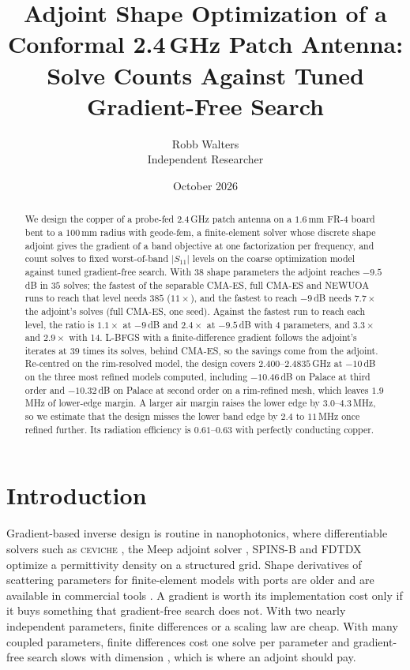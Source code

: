 \documentclass{anvil-paper}
\title{Adjoint Shape Optimization of a Conformal 2.4\,GHz Patch Antenna:
Solve Counts Against Tuned Gradient-Free Search}
\author{Robb Walters\\
  {\normalsize Independent Researcher}}
\date{October 2026}
\begin{document}
\maketitle

\begin{abstract}
We design the copper of a probe-fed 2.4\,GHz patch antenna on a $1.6$\,mm
FR-4 board bent to a $100$\,mm radius with geode-fem, a finite-element
solver whose discrete shape adjoint gives the gradient of a band objective
at one factorization per frequency, and count solves to fixed worst-of-band
$|S_{11}|$ levels on the coarse optimization model against tuned
gradient-free search. With 38 shape parameters the adjoint reaches
$-9.5$\,dB in $35$ solves; the fastest of the separable CMA-ES, full CMA-ES
and NEWUOA runs to reach that level needs $385$ ($11\times$), and the
fastest to reach $-9$\,dB needs $7.7\times$ the adjoint's solves (full
CMA-ES, one seed).
Against the fastest run to reach each level, the ratio is $1.1\times$ at
$-9$\,dB and $2.4\times$ at $-9.5$\,dB with 4 parameters, and $3.3\times$ and
$2.9\times$ with 14. L-BFGS with a finite-difference gradient follows the
adjoint's iterates at $39$ times its solves, behind CMA-ES, so the savings
come from the adjoint. Re-centred on the rim-resolved model, the design covers $2.400$--$2.4835$\,GHz at $-10$\,dB on the
three most refined models computed, including $-10.46$\,dB on Palace at
third order and $-10.32$\,dB on Palace at second order on a rim-refined
mesh, which leaves $1.9$\,MHz of lower-edge margin. A larger air margin
raises the lower edge by $3.0$--$4.3$\,MHz, so we estimate that the design
misses the lower band edge by $2.4$ to $11$\,MHz once refined further. Its
radiation efficiency is $0.61$--$0.63$ with perfectly conducting copper.
\end{abstract}

\section{Introduction}
\label{sec:intro}

Gradient-based inverse design is routine in nanophotonics, where
differentiable solvers such as \textsc{ceviche} \citep{hughes2019forward},
the Meep adjoint solver \citep{hammond2022meepadjoint}, SPINS-B
\citep{su_spinsb} and FDTDX \citep{mahlau2026fdtdx} optimize a permittivity
density on a structured grid. Shape derivatives of scattering parameters for
finite-element models with ports are older
\citep{webb2000design,georgieva2002feasible,nikolova2004adjoint} and are
available in commercial tools
\citep{ansys_hfss_derivatives,comsol_sensitivity_method}. A gradient is worth
its implementation cost only if it buys something that gradient-free search
does not. With two nearly independent parameters, finite differences or a
scaling law are cheap. With many coupled parameters, finite differences cost
one solve per parameter and gradient-free search slows with dimension
\citep{rios2013derivative}, which is where an adjoint should pay.
\end{document}
